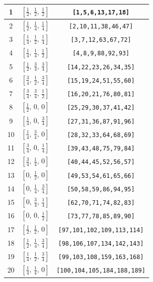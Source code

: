 \documentclass[fleqn,8pt]{jsarticle}
\begin{document}
\begin{longtable}{ccc}
1 & $\left[ \frac{1}{2},\, \frac{1}{2},\, \frac{1}{2} \right]$ & {\tt [1,5,6,13,17,18]} \\ \hline
2 & $\left[ \frac{1}{2},\, \frac{1}{4},\, \frac{1}{4} \right]$ & {\tt [2,10,11,38,46,47]} \\ \hline
3 & $\left[ \frac{1}{4},\, \frac{1}{2},\, \frac{1}{4} \right]$ & {\tt [3,7,12,63,67,72]} \\ \hline
4 & $\left[ \frac{1}{4},\, \frac{1}{4},\, \frac{1}{2} \right]$ & {\tt [4,8,9,88,92,93]} \\ \hline
5 & $\left[ \frac{1}{2},\, \frac{3}{4},\, \frac{3}{4} \right]$ & {\tt [14,22,23,26,34,35]} \\ \hline
6 & $\left[ \frac{3}{4},\, \frac{1}{2},\, \frac{3}{4} \right]$ & {\tt [15,19,24,51,55,60]} \\ \hline
7 & $\left[ \frac{3}{4},\, \frac{3}{4},\, \frac{1}{2} \right]$ & {\tt [16,20,21,76,80,81]} \\ \hline
8 & $\left[ \frac{1}{2},\, 0,\, 0 \right]$ & {\tt [25,29,30,37,41,42]} \\ \hline
9 & $\left[ \frac{1}{4},\, 0,\, \frac{3}{4} \right]$ & {\tt [27,31,36,87,91,96]} \\ \hline
10 & $\left[ \frac{1}{4},\, \frac{3}{4},\, 0 \right]$ & {\tt [28,32,33,64,68,69]} \\ \hline
11 & $\left[ \frac{3}{4},\, 0,\, \frac{1}{4} \right]$ & {\tt [39,43,48,75,79,84]} \\ \hline
12 & $\left[ \frac{3}{4},\, \frac{1}{4},\, 0 \right]$ & {\tt [40,44,45,52,56,57]} \\ \hline
13 & $\left[ 0,\, \frac{1}{2},\, 0 \right]$ & {\tt [49,53,54,61,65,66]} \\ \hline
14 & $\left[ 0,\, \frac{1}{4},\, \frac{3}{4} \right]$ & {\tt [50,58,59,86,94,95]} \\ \hline
15 & $\left[ 0,\, \frac{3}{4},\, \frac{1}{4} \right]$ & {\tt [62,70,71,74,82,83]} \\ \hline
16 & $\left[ 0,\, 0,\, \frac{1}{2} \right]$ & {\tt [73,77,78,85,89,90]} \\ \hline
17 & $\left[ \frac{1}{2},\, \frac{1}{2},\, 0 \right]$ & {\tt [97,101,102,109,113,114]} \\ \hline
18 & $\left[ \frac{1}{2},\, \frac{1}{4},\, \frac{3}{4} \right]$ & {\tt [98,106,107,134,142,143]} \\ \hline
19 & $\left[ \frac{1}{4},\, \frac{1}{2},\, \frac{3}{4} \right]$ & {\tt [99,103,108,159,163,168]} \\ \hline
20 & $\left[ \frac{1}{4},\, \frac{1}{4},\, 0 \right]$ & {\tt [100,104,105,184,188,189]} \\ \hline

\end{longtable}
\end{document}
